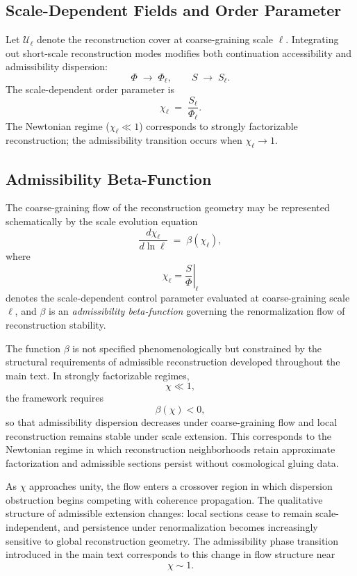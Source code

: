 \documentclass[11pt, a4paper]{article}
\theoremstyle{plain}
\theoremstyle{definition}
\theoremstyle{remark}
\newcommand{\Ucover}{\mathcal{U}}
\begin{document}
\subsection{Scale-Dependent Fields and Order Parameter}

Let $\Ucover_\ell$ denote the reconstruction cover at coarse-graining scale $\ell$.
Integrating out short-scale reconstruction modes modifies both continuation
accessibility and admissibility dispersion:
\[
  \Phi \;\longrightarrow\; \Phi_\ell, \qquad S \;\longrightarrow\; S_\ell.
\]
The scale-dependent order parameter is
\[
  \chi_\ell \;=\; \frac{S_\ell}{\Phi_\ell}.
\]
The Newtonian regime ($\chi_\ell \ll 1$) corresponds to strongly factorizable
reconstruction; the admissibility transition occurs when $\chi_\ell \to 1$.

\subsection{Admissibility Beta-Function}

The coarse-graining flow of the reconstruction geometry may be represented
schematically by the scale evolution equation
\begin{equation}
  \label{eq:beta}
  \frac{d\chi_\ell}{d\ln \ell}
  \;=\;
  \beta(\chi_\ell),
\end{equation}
where
\[
  \chi_\ell
  =
  \left.\frac{S}{\Phi}\right|_{\ell}
\]
denotes the scale-dependent control parameter evaluated at coarse-graining scale
$\ell$, and $\beta$ is an \emph{admissibility beta-function} governing the
renormalization flow of reconstruction stability.

The function $\beta$ is not specified phenomenologically but constrained by the
structural requirements of admissible reconstruction developed throughout the main
text.  In strongly factorizable regimes,
\[
  \chi \ll 1,
\]
the framework requires
\[
  \beta(\chi) < 0,
\]
so that admissibility dispersion decreases under coarse-graining flow and local
reconstruction remains stable under scale extension.  This corresponds to the
Newtonian regime in which reconstruction neighborhoods retain approximate
factorization and admissible sections persist without cosmological gluing data.

As $\chi$ approaches unity, the flow enters a crossover region in which dispersion
obstruction begins competing with coherence propagation.  The qualitative structure
of admissible extension changes: local sections cease to remain scale-independent,
and persistence under renormalization becomes increasingly sensitive to global
reconstruction geometry.  The admissibility phase transition introduced in the main
text corresponds to this change in flow structure near
\[
  \chi \sim 1.
\]
\end{document}
